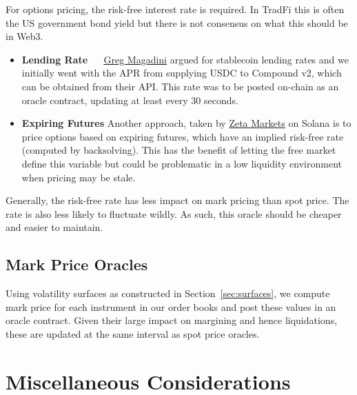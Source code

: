 \documentclass{article}
\begin{document}
For options pricing, the risk-free interest rate is required. In TradFi this is often the US government bond yield but there is not consensus on what this should be in Web3. 
\begin{itemize}
    \item \textbf{Lending Rate} $\quad$ \href{https://insights.deribit.com/industry/option-quotes-using-forwards/}{Greg Magadini} argued for stablecoin lending rates and we initially went with the APR from supplying USDC to Compound v2, which can be obtained from their API. This rate was to be posted on-chain as an oracle contract, updating at least every 30 seconds.
    \item  \textbf{Expiring Futures} Another approach, taken by \href{https://docs.zeta.markets/zeta-protocol/zeta-infrastructure/margin-system/mark-pricing}{Zeta Markets} on Solana is to price options based on expiring futures, which have an implied risk-free rate (computed  by backsolving). This has the benefit of letting the free market define this variable but could be problematic in a low liquidity environment when pricing may be stale.
\end{itemize}
Generally, the risk-free rate has less impact on mark pricing than spot price. The rate is also less likely to fluctuate wildly. As such, this oracle should be cheaper and easier to maintain.

\subsection{Mark Price Oracles} 

Using volatility surfaces as constructed in Section~\ref{sec:surfaces}, we compute mark price for each instrument in our order books and post these values in an oracle contract. Given their large impact on margining and hence liquidations, these are updated at the same interval as spot price oracles. 

\section{Miscellaneous Considerations}
\end{document}
